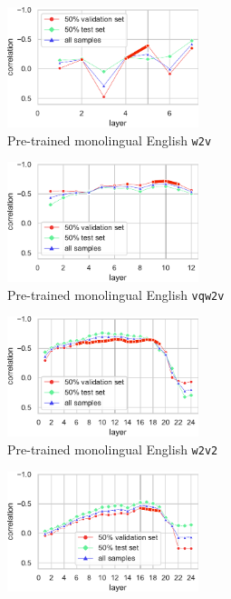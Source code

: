 \documentclass[11pt,a4paper]{article}
\begin{document}
\begin{figure}[ht]
       \begin{subfigure}[b]{0.49\textwidth}
         \centering
         \includegraphics[width=2.2in]{figures/DSD/wav2vec-large.pdf}
         \caption{Pre-trained monolingual English \texttt{w2v}}
         \label{fig:curveW2VDSD}
      \end{subfigure}
      \begin{subfigure}[b]{0.49\textwidth}
         \centering
         \includegraphics[width=2.2in]{figures/DSD/vq-wav2vec.pdf}
         \caption{Pre-trained monolingual English \texttt{vqw2v}}
         \label{fig:curveVQW2VDSD}
     \end{subfigure}
     \par\smallskip
     \begin{subfigure}[b]{0.49\textwidth}
         \centering
         \includegraphics[width=2.2in]{figures/DSD/wav2vec2-large.pdf}
         \caption{Pre-trained monolingual English \texttt{w2v2}}
         \label{fig:curveW2V2DSD}
     \end{subfigure}
     \begin{subfigure}[b]{0.49\textwidth}
         \centering
         \includegraphics[width=2.2in]{figures/DSD/wav2vec2-large-xlsr-53.pdf}

\end{subfigure}
\end{figure}
\end{document}
